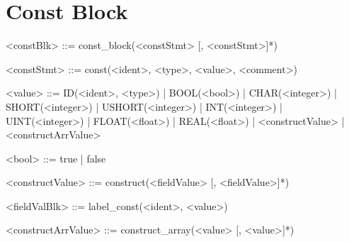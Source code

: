 \documentclass{article}
\begin{document}
\section{Const Block}
\begin{grammar} \small

<constBlk> ::= const_block(<constStmt> [, <constStmt>]*)

<constStmt> ::= const(<ident>, <type>, <value>, <comment>)

<value> ::= ID(<ident>, <type>) | BOOL(<bool>) | CHAR(<integer>) | SHORT(<integer>) | USHORT(<integer>) |
            INT(<integer>) | UINT(<integer>) | FLOAT(<float>) | REAL(<float>) |
            <constructValue> | <constructArrValue>

<bool> ::= true | false

<constructValue> ::= construct(<fieldValue> [, <fieldValue>]*)

<fieldValBlk> ::= label_const(<ident>, <value>)

<constructArrValue> ::= construct_array(<value> [, <value>]*)

\end{grammar}
\end{document}
